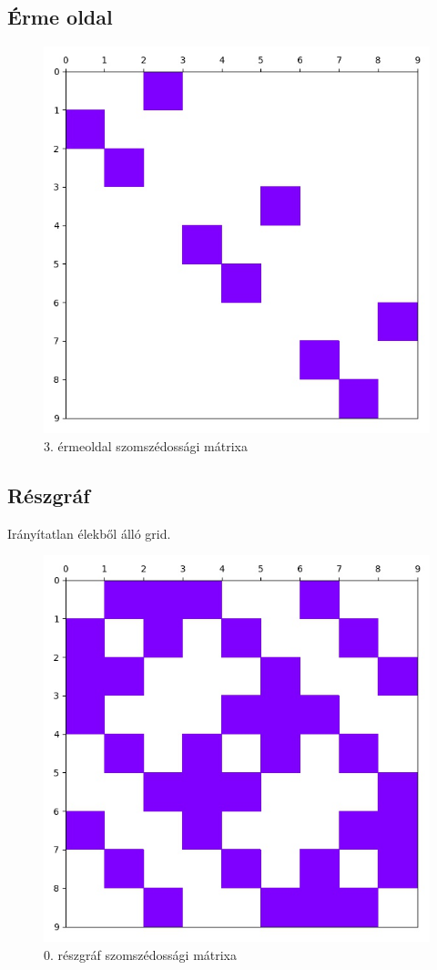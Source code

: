 \documentclass[14pt,a4paper]{article}
\begin{document}
\subsection{Érme oldal}
\begin{figure}[H]
\centering
\includegraphics[width = 0.7\columnwidth]{coin_faces/coin_face_03.jpg}
\caption{3. érmeoldal szomszédossági mátrixa}
\end{figure}
\subsection{Részgráf}
Irányítatlan élekből álló grid.
\begin{figure}[H]
\centering
\includegraphics[width = 0.7\columnwidth]{graph/sub_graph_00.jpg}
\caption{0. részgráf szomszédossági mátrixa}
\end{figure}
\end{document}
